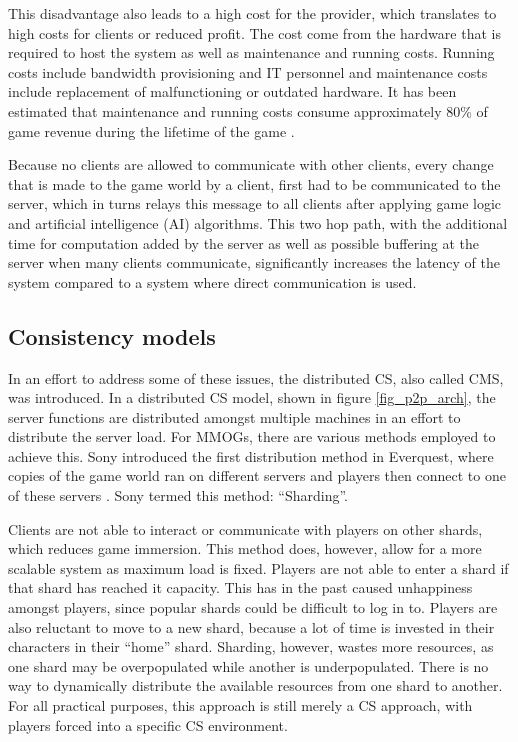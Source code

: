 \documentclass[journal,oneside,a4paper,onecolumn]{IEEEtran}
\begin{document}
This disadvantage also leads to a high cost for the provider, which translates to high costs for clients or reduced profit. The cost come from the hardware that is required to host the system as well as maintenance and running costs. Running costs include bandwidth provisioning and IT personnel and maintenance costs include replacement of malfunctioning or outdated hardware. It has been estimated that maintenance and running costs consume approximately 80\% of game revenue during the lifetime of the game \cite{cs_mmog_cost}.

Because no clients are allowed to communicate with other clients, every change that is made to the game world by a client, first had to be communicated to the server, which in turns relays this message to all clients after applying game logic and artificial intelligence (AI) algorithms. This two hop path, with the additional time for computation added by the server as well as possible buffering at the server when many clients communicate, significantly increases the latency of the system compared to a system where direct communication is used.

\subsection{Consistency models}

In an effort to address some of these issues, the distributed \ac{CS}, also called \ac{CMS}, was introduced. In a distributed \ac{CS} model, shown in figure \ref{fig_p2p_arch}, the server functions are distributed amongst multiple machines in an effort to distribute the server load. For MMOGs, there are various methods employed to achieve this. Sony introduced the first distribution method in Everquest, where copies of the game world ran on different servers and players then connect to one of these servers \cite{engineering_everquest}. Sony termed this method: ``Sharding''.

Clients are not able to interact or communicate with players on other shards, which reduces game immersion. This method does, however, allow for a more scalable system as maximum load is fixed. Players are not able to enter a shard if that shard has reached it capacity. This has in the past caused unhappiness amongst players, since popular shards could be difficult to log in to. Players are also reluctant to move to a new shard, because a lot of time is invested in their characters in their ``home'' shard. Sharding, however, wastes more resources, as one shard may be overpopulated while another is underpopulated. There is no way to dynamically distribute the available resources from one shard to another. For all practical purposes, this approach is still merely a \ac{CS} approach, with players forced into a specific \ac{CS} environment.
\end{document}
